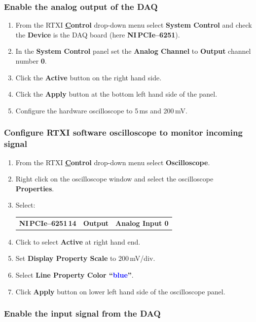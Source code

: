 \documentclass[12pt]{article}
\begin{document}
\subsubsection*{Enable the analog output of the DAQ}

\begin{enumerate}
	\item From the RTXI {\bf \underline Control} drop-down menu select {\bf System Control}  and check 
		the {\bf  Device} is the DAQ board (here {\bf NI\,PCIe--6251}).
	\item In the {\bf System Control} panel set the {\bf Analog Channel} to {\bf Output} channel number 
		{\bf 0}.
	\item Click the {\bf Active} button on the right hand side.
	\item Click the {\bf Apply} button at the bottom left hand side of the panel.
	\item Configure the hardware oscilloscope to 5\,ms and 200\,mV.
\end{enumerate}

\subsubsection*{Configure RTXI software oscilloscope to monitor incoming signal}

\begin{enumerate}
	\item From the RTXI {\bf \underline Control} drop-down menu select {\bf Oscilloscope}.
	\item Right click on the oscilloscope window and select the oscilloscope {\bf Properties}.
	\item Select:
		\begin{tabular}{ l c r }
			{\bf NI\,PCIe--6251\,14} & {\bf Output} & {\bf Analog Input 0}
		\end{tabular}
	\item Click to select {\bf Active} at right hand end.
	\item Set {\bf Display Property Scale} to 200\,mV/div.
	\item Select {\bf Line Property Color ``\textcolor{blue}{blue}''}.
	\item Click {\bf Apply} button on lower left hand side of the oscilloscope panel.
\end{enumerate}

\subsubsection*{Enable the input signal from the DAQ}
\end{document}
